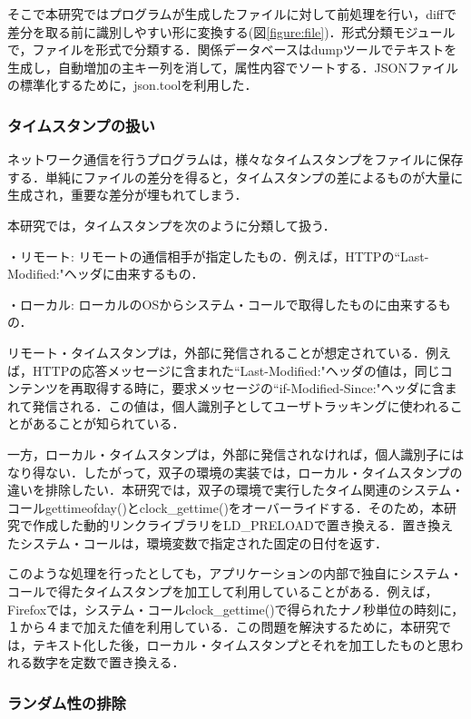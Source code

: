 \documentclass[submit,techrep]{ipsj}
\begin{document}
そこで本研究ではプログラムが生成したファイルに対して前処理を行い，diffで差分を取る前に識別しやすい形に変換する(図\ref{figure:file})．形式分類モジュールで，ファイルを形式で分類する．関係データベースはdumpツールでテキストを生成し，自動増加の主キー列を消して，属性内容でソートする．JSONファイルの標準化するために，json.toolを利用した．


\subsubsection{タイムスタンプの扱い}
\label{cha:timestamp}
ネットワーク通信を行うプログラムは，様々なタイムスタンプをファイルに保存する．単純にファイルの差分を得ると，タイムスタンプの差によるものが大量に生成され，重要な差分が埋もれてしまう．

本研究では，タイムスタンプを次のように分類して扱う．


\begin{description}
\item{・リモート: }
リモートの通信相手が指定したもの．例えば，HTTPの``Last-Modified:"ヘッダに由来するもの．
\item{・ローカル: }
ローカルのOSからシステム・コールで取得したものに由来するもの．
\end{description}


リモート・タイムスタンプは，外部に発信されることが想定されている．例えば，HTTPの応答メッセージに含まれた``Last-Modified:"ヘッダの値は，同じコンテンツを再取得する時に，要求メッセージの``if-Modified-Since:"ヘッダに含まれて発信される．この値は，個人識別子としてユーザトラッキングに使われることがあることが知られている．

一方，ローカル・タイムスタンプは，外部に発信されなければ，個人識別子にはなり得ない．したがって，双子の環境の実装では，ローカル・タイムスタンプの違いを排除したい．本研究では，双子の環境で実行したタイム関連のシステム・コールgettimeofday()とclock\_gettime()をオーバーライドする．そのため，本研究で作成した動的リンクライブラリをLD\_PRELOADで置き換える．置き換えたシステム・コールは，環境変数で指定された固定の日付を返す．


このような処理を行ったとしても，アプリケーションの内部で独自にシステム・コールで得たタイムスタンプを加工して利用していることがある．例えば，Firefoxでは，システム・コールclock\_gettime()で得られたナノ秒単位の時刻に，１から４まで加えた値を利用している．この問題を解決するために，本研究では，テキスト化した後，ローカル・タイムスタンプとそれを加工したものと思われる数字を定数で置き換える．

\subsubsection{ランダム性の排除}
\end{document}
